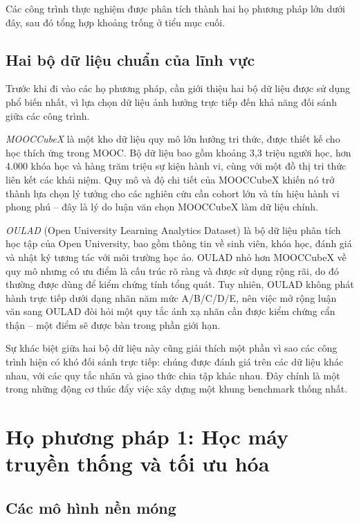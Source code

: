 Các công trình thực nghiệm được phân tích thành hai họ phương pháp lớn dưới đây, sau đó tổng hợp khoảng trống ở tiểu mục cuối.

\subsection{Hai bộ dữ liệu chuẩn của lĩnh vực}

Trước khi đi vào các họ phương pháp, cần giới thiệu hai bộ dữ liệu được sử dụng phổ biến nhất, vì lựa chọn dữ liệu ảnh hưởng trực tiếp đến khả năng đối sánh giữa các công trình.

\textit{MOOCCubeX} \cite{Yu2021} là một kho dữ liệu quy mô lớn hướng tri thức, được thiết kế cho học thích ứng trong MOOC. Bộ dữ liệu bao gồm khoảng 3,3 triệu người học, hơn 4.000 khóa học và hàng trăm triệu sự kiện hành vi, cùng với một đồ thị tri thức liên kết các khái niệm. Quy mô và độ chi tiết của MOOCCubeX khiến nó trở thành lựa chọn lý tưởng cho các nghiên cứu cần cohort lớn và tín hiệu hành vi phong phú -- đây là lý do luận văn chọn MOOCCubeX làm dữ liệu chính.

\textit{OULAD} (Open University Learning Analytics Dataset) \cite{Kuzilek2017} là bộ dữ liệu phân tích học tập của Open University, bao gồm thông tin về sinh viên, khóa học, đánh giá và nhật ký tương tác với môi trường học ảo. OULAD nhỏ hơn MOOCCubeX về quy mô nhưng có ưu điểm là cấu trúc rõ ràng và được sử dụng rộng rãi, do đó thường được dùng để kiểm chứng tính tổng quát. Tuy nhiên, OULAD không phát hành trực tiếp dưới dạng nhãn năm mức A/B/C/D/E, nên việc mở rộng luận văn sang OULAD đòi hỏi một quy tắc ánh xạ nhãn cần được kiểm chứng cẩn thận -- một điểm sẽ được bàn trong phần giới hạn.

Sự khác biệt giữa hai bộ dữ liệu này cũng giải thích một phần vì sao các công trình hiện có khó đối sánh trực tiếp: chúng được đánh giá trên các dữ liệu khác nhau, với các quy tắc nhãn và giao thức chia tập khác nhau. Đây chính là một trong những động cơ thúc đẩy việc xây dựng một khung benchmark thống nhất.

\section{Họ phương pháp 1: Học máy truyền thống và tối ưu hóa}
\label{sec:hoML}

\subsection{Các mô hình nền móng}


